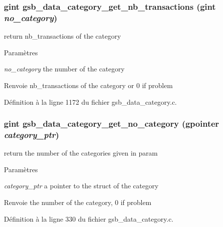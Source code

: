 \subsubsection[{gsb\_\-data\_\-category\_\-get\_\-nb\_\-transactions}]{\setlength{\rightskip}{0pt plus 5cm}gint gsb\_\-data\_\-category\_\-get\_\-nb\_\-transactions (gint {\em no\_\-category})}\label{gsb__data__category_8h_a680b3ce8f52b52d129b7476030f28751}
return nb\_\-transactions of the category


\begin{DoxyParams}{Paramètres}
\item[{\em no\_\-category}]the number of the category\end{DoxyParams}
\begin{DoxyReturn}{Renvoie}
nb\_\-transactions of the category or 0 if problem 
\end{DoxyReturn}


Définition à la ligne 1172 du fichier gsb\_\-data\_\-category.c.

\subsubsection[{gsb\_\-data\_\-category\_\-get\_\-no\_\-category}]{\setlength{\rightskip}{0pt plus 5cm}gint gsb\_\-data\_\-category\_\-get\_\-no\_\-category (gpointer {\em category\_\-ptr})}\label{gsb__data__category_8h_ad96f1f1ae0532eb5ae3503a79dcaa64d}
return the number of the categories given in param


\begin{DoxyParams}{Paramètres}
\item[{\em category\_\-ptr}]a pointer to the struct of the category\end{DoxyParams}
\begin{DoxyReturn}{Renvoie}
the number of the category, 0 if problem 
\end{DoxyReturn}


Définition à la ligne 330 du fichier gsb\_\-data\_\-category.c.

